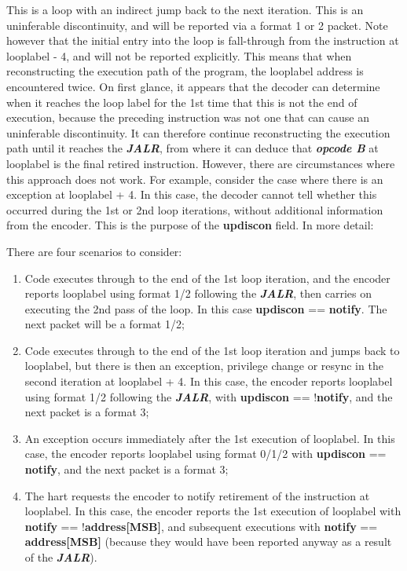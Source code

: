 This is a loop with an indirect jump back to the next iteration.  This is an uninferable discontinuity, and will be
reported via a format 1 or 2 packet.  Note however that the initial entry into the loop is fall-through from the
instruction at looplabel - 4, and will not be reported explicitly.  This means that when reconstructing the execution 
path of the program, the looplabel address is encountered twice.  On first glance, it appears that the decoder can determine
when it reaches the loop label for the 1st time that this is not the end of execution, because the preceding
instruction was not one that can cause an uninferable discontinuity.  It can therefore continue reconstructing the 
execution path until it reaches the \textbf{\textit{JALR}}, from where it can deduce that \textbf{\textit{opcode B}} at
looplabel is the final retired instruction.  However, there are circumstances where this approach 
does not work.  For example, consider the case where there is an exception at looplabel + 4.  In this case, the decoder
cannot tell whether this occurred during the 1st or 2nd loop iterations, without additional information from the 
encoder.  This is the purpose of the \textbf{updiscon} field.  In more detail:

There are four scenarios to consider:

\begin{enumerate}
  \item Code executes through to the end of the 1st loop iteration, and the encoder reports looplabel using format 1/2 following 
    the \textbf{\textit{JALR}}, then carries on executing the 2nd pass of the loop.  In this case \textbf{updiscon} == \textbf{notify}.  
    The next packet will be a format 1/2;
  \item Code executes through to the end of the 1st loop iteration and jumps back to looplabel, but there is then an exception, 
    privilege change or resync in the second iteration at looplabel + 4.  In this case, the encoder reports looplabel using 
    format 1/2 following the \textbf{\textit{JALR}}, with \textbf{updiscon} == !\textbf{notify}, and the next packet is a 
    format 3;
  \item An exception occurs immediately after the 1st execution of looplabel.  In this case, the encoder reports looplabel using 
    format 0/1/2 with \textbf{updiscon} == \textbf{notify}, and the next packet is a format 3;
  \item The hart requests the encoder to notify retirement of the instruction at looplabel.  In this case, the encoder reports the 1st 
    execution of looplabel with \textbf{notify} == !\textbf{address[MSB]}, and subsequent executions with \textbf{notify} == 
    \textbf{address[MSB]} (because they would have been reported anyway as a result of the \textbf{\textit{JALR}}).
\end{enumerate}

